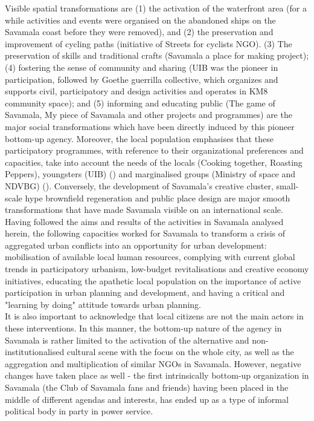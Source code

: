 \documentclass[11pt]{report}
\begin{document}
Visible spatial transformations are
(1) the activation of the waterfront area (for a while activities and events were organised on the abandoned ships on the Savamala coast before they were removed),
and
(2) the preservation and improvement of cycling paths (initiative of Streets for cyclists NGO).
(3) The preservation of skills and traditional crafts (Savamala a place for making project);
(4) fostering the sense of community and sharing (UIB was the pioneer in participation, followed by Goethe guerrilla collective, which organizes and supports civil, participatory and design activities and operates in KM8 community space);
and
(5) informing and educating public (The game of Savamala, My piece of Savamala and other projects and programmes) are the major social transformations which have been directly induced by this pioneer bottom-up agency.
Moreover, the local population emphasises that these participatory programmes, with reference to their organizational preferences and capacities, take into account the needs of the locals (Cooking together, Roasting Peppers), youngsters (UIB) (\href{Muller}{\cite{(muller-wieferig_urban_2013}})
and marginalised groups (Ministry of space and NDVBG)
(\href{Mitic}{\cite{MiticAndMiladinovic2016}}).
Conversely, the development of Savamala’s creative cluster, small-scale hype brownfield regeneration and public place design are major smooth transformations that have made Savamala visible on an international scale.
\\

Having followed the aims and results of the activities in Savamala analysed herein, the following capacities worked for Savamala to transform a crisis of aggregated urban conflicts into an opportunity for urban development:
mobilisation of available local human resources,
complying with current global trends in participatory urbanism, low-budget revitalisations and creative economy initiatives, educating the apathetic local population on the importance of active participation in urban planning and development,
and
having a critical and "learning by doing" attitude  towards urban planning.
\\

It is also important to acknowledge that local citizens are not the main actors in these interventions.
In this manner, the bottom-up nature of the agency in Savamala is rather limited to the activation of the alternative and non-institutionalised cultural scene with the focus on the whole city, as well as the aggregation and multiplication of similar NGOs in Savamala.
However, negative changes have taken place as well - the first intrinsically bottom-up organization in Savamala (the Club of Savamala fans and friends) having been placed in the middle of different agendas and interests, has ended up as a type of informal political body in party in power service.
\\
\end{document}
